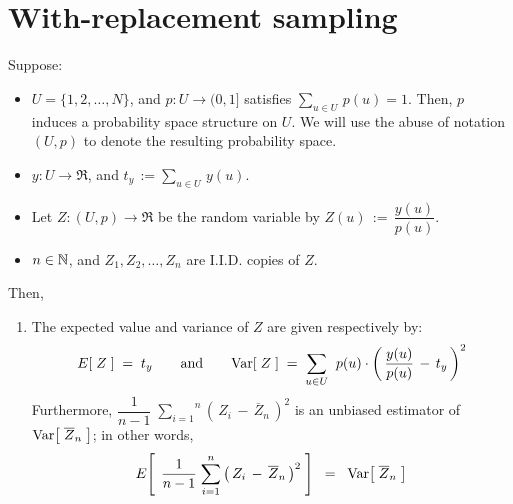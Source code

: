 

\section{With-replacement sampling}
\setcounter{theorem}{0}
\setcounter{equation}{0}


\renewcommand{\theenumi}{\roman{enumi}}
\renewcommand{\labelenumi}{\textnormal{(\theenumi)}$\;\;$}


\begin{theorem}
\mbox{}\vskip 0.2cm
\noindent
Suppose:
\begin{itemize}
\item
	$U = \{1,2,\ldots,N\}$,
	\;and\;
	$p : U \longrightarrow (0,1]$ \;satisfies\; $\underset{u \in U}{\sum}\,p(u) = 1$.
	\vskip 0.1cm
	Then, $p$ induces a probability space structure on $U$.
	We will use the abuse of notation $(U,p)$ to denote the resulting probability space.
\item
	$y : U \longrightarrow \Re$, \;and\; $t_{y} \,:= \underset{u \in U}{\sum}\,y(u)$.
\item
	Let $Z : (U,p) \longrightarrow \Re$ be the random variable by\;
	$Z(u) \,:=\, \dfrac{y(u)}{p(u)}$.
\item
	$n \in \mathbb{N}$, \;and\; $Z_{1}, Z_{2}, \ldots, Z_{n}$ are I.I.D. copies of $Z$.
\end{itemize}
Then,
\begin{enumerate}
\item
	The expected value and variance of $Z$ are given respectively by:
	\begin{equation*}
	E\!\left[\;Z\;\right] \;=\; t_{y}
	\quad\quad\textnormal{and}\quad\quad
	\textnormal{Var}\!\left[\;Z\;\right] \;=\; \underset{u \in U}{\sum}\;\; p(u)\cdot\left(\,\dfrac{y(u)}{p(u)}\,-\,t_{y}\,\right)^{2}
	\end{equation*}
	Furthermore,\;
	$\dfrac{1}{n-1}\;\overset{n}{\underset{i=1}{\sum}}\left(\,Z_{i} \,-\, \overline{Z}_{n}\,\right)^{2}$\;
	is an unbiased estimator of \,$\textnormal{Var}\!\left[\;\overline{Z}_{n}\;\right]$; in other words,	
	\begin{equation*}
	E\!\left[\;\,\dfrac{1}{n-1}\;\overset{n}{\underset{i=1}{\sum}}\left(\,Z_{i} \,-\, \overline{Z}_{n}\,\right)^{2}\;\right]
	\;\; = \;\;
		\Var\!\left[\;\overline{Z}_{n}\;\right]

\end{equation*}
\end{enumerate}
\end{theorem}
